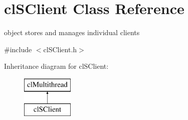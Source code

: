 \hypertarget{classcl_s_client}{
\section{clSClient Class Reference}
\label{classcl_s_client}
}


object stores and manages individual clients  




{\ttfamily \#include $<$clSClient.h$>$}

Inheritance diagram for clSClient:\begin{figure}[H]
\begin{center}
\leavevmode
\includegraphics[height=2.000000cm]{classcl_s_client}
\end{center}
\end{figure}
